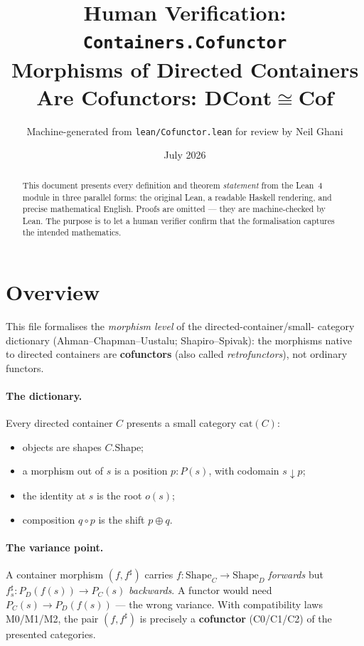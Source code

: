 \documentclass[11pt,a4paper]{article}
\title{Human Verification: \texttt{Containers.Cofunctor}\\[4pt]
  \large Morphisms of Directed Containers Are Cofunctors: $\mathbf{DCont} \cong \mathbf{Cof}$}
\author{Machine-generated from \texttt{lean/Cofunctor.lean} for review by Neil Ghani}
\date{July 2026}
\begin{document}
\maketitle

\begin{abstract}
This document presents every definition and theorem \emph{statement} from the
Lean~4 module  in three parallel forms: the original
Lean, a readable Haskell rendering, and precise mathematical English.  Proofs
are omitted --- they are machine-checked by Lean.  The purpose is to let a
human verifier confirm that the formalisation captures the intended mathematics.
\end{abstract}

\tableofcontents
\bigskip

\section{Overview}

This file formalises the \emph{morphism level} of the directed-container/small-
category dictionary (Ahman--Chapman--Uustalu; Shapiro--Spivak): the morphisms
native to directed containers are \textbf{cofunctors} (also called
\emph{retrofunctors}), not ordinary functors.

\paragraph{The dictionary.}
Every directed container $C$ presents a small category $\mathrm{cat}(C)$:
\begin{itemize}
  \item objects are shapes $C.\mathrm{Shape}$;
  \item a morphism out of $s$ is a position $p : P(s)$, with codomain
        $s \downarrow p$;
  \item the identity at $s$ is the root $o(s)$;
  \item composition $q \circ p$ is the shift $p \oplus q$.
\end{itemize}

\paragraph{The variance point.}
A container morphism $(f, f^\sharp)$ carries $f : \mathrm{Shape}_C \to
\mathrm{Shape}_D$ \emph{forwards} but $f^\sharp_s : P_D(f(s)) \to P_C(s)$
\emph{backwards}.  A functor would need $P_C(s) \to P_D(f(s))$ --- the wrong
variance.  With compatibility laws M0/M1/M2, the pair $(f, f^\sharp)$ is
precisely a \textbf{cofunctor} (C0/C1/C2) of the presented categories.
\end{document}
